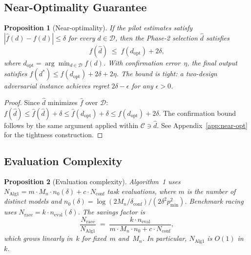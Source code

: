 \documentclass[11pt]{article}
\newtheorem{proposition}{Proposition}
\newtheorem{proof}{Proof}
\newcommand{\cD}{\mathcal{D}}
\newcommand{\cC}{\mathcal{C}}
\newcommand{\Mn}{M_n}
\newcommand{\pmin}{p_{\min}}
\newcommand{\dconf}{\delta_{\mathrm{conf}}}
\begin{document}
\subsection{Near-Optimality Guarantee}

\begin{proposition}[Near-optimality]
\label{prop:near-opt}
If the pilot estimates satisfy $|\hat{f}(d) - f(d)| \le \delta$ for every
$d \in \cD$, then the Phase-2 selection $\hat{d}$ satisfies
\begin{equation}
\label{eq:near-opt}
  f(\hat{d}) \;\le\; f(d_{\mathrm{opt}}) + 2\delta,
\end{equation}
where $d_{\mathrm{opt}} = \arg\min_{d \in \cD} f(d)$.
With confirmation error~$\eta$, the final output satisfies
$f(d^*) \le f(d_{\mathrm{opt}}) + 2\delta + 2\eta$.
The bound is tight: a two-design adversarial instance achieves
regret $2\delta - \epsilon$ for any $\epsilon > 0$.
\end{proposition}

\begin{proof}
Since $\hat{d}$ minimizes $\hat{f}$ over $\cD$:
$f(\hat{d}) \le \hat{f}(\hat{d}) + \delta
\le \hat{f}(d_{\mathrm{opt}}) + \delta
\le f(d_{\mathrm{opt}}) + 2\delta$.
The confirmation bound follows by the same argument applied within
$\cC \ni \hat{d}$.  See Appendix~\ref{app:near-opt} for the tightness
construction.
\end{proof}

\subsection{Evaluation Complexity}

\begin{proposition}[Evaluation complexity]
\label{prop:eval-complexity}
Algorithm~1 uses
$N_{\mathrm{Alg1}} = m \cdot \Mn \cdot n_0(\delta) + c \cdot N_{\mathrm{conf}}$
task evaluations, where $m$ is the number of distinct models and
$n_0(\delta) = \log(2\Mn/\dconf) / (2\delta^2 \pmin^2)$.
Benchmark racing uses $N_{\mathrm{race}} = k \cdot n_{\mathrm{eval}}(\delta)$.
The savings factor is
\begin{equation}
\label{eq:savings}
  \frac{N_{\mathrm{race}}}{N_{\mathrm{Alg1}}}
  \;=\; \frac{k \cdot n_{\mathrm{eval}}}{m \cdot \Mn \cdot n_0 + c \cdot N_{\mathrm{conf}}},
\end{equation}
which grows linearly in~$k$ for fixed~$m$ and~$\Mn$.
In particular, $N_{\mathrm{Alg1}}$ is $O(1)$ in~$k$.
\end{proposition}
\end{document}
